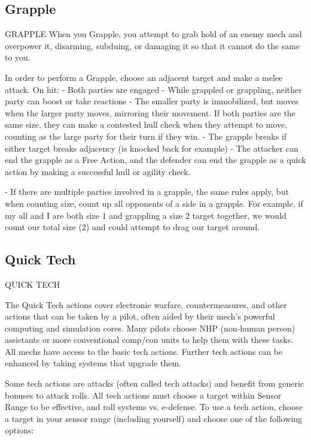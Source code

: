 \subsection{Grapple}

                                              GRAPPLE
When you Grapple, you attempt to grab hold of an enemy mech and overpower it, disarming,
subduing, or damaging it so that it cannot do the same to you.

In order to perform a Grapple, choose an adjacent target and make a melee attack. On hit:
    -   Both parties are engaged
    -   While grappled or grappling, neither party can boost or take reactions
    -   The smaller party is immobilized, but moves when the larger party moves, mirroring their
        movement. If both parties are the same size, they can make a contested hull check when
        they attempt to move, counting as the large party for their turn if they win.
    -   The grapple breaks if either target breaks adjacency (is knocked back for example)
    -   The attacker can end the grapple as a Free Action, and the defender can end the grapple
        as a quick action by making a successful hull or agility check.




    -    If there are multiple parties involved in a grapple, the same rules apply, but when counting
         size, count up all opponents of a side in a grapple. For example, if my all and I are both
         size 1 and grappling a size 2 target together, we would count our total size (2) and could
         attempt to drag our target around.
\subsection{Quick Tech}

                                              QUICK TECH

The Quick Tech actions cover electronic warfare, countermeasures, and other actions that can
be taken by a pilot, often aided by their mech’s powerful computing and simulation cores. Many
pilots choose NHP (non-human person) assistants or more conventional comp/con units to help
them with these tasks. All mechs have access to the basic tech actions. Further tech actions can
be enhanced by taking systems that upgrade them.


Some tech actions are attacks (often called tech attacks) and benefit from generic bonuses to
attack rolls. All tech actions must choose a target within Sensor Range to be effective, and roll
systems vs. e-defense. To use a tech action, choose a target in your sensor range (including
yourself) and choose one of the following options:


